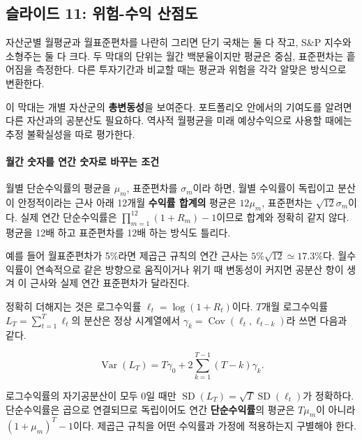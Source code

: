 \documentclass[11pt,a4paper]{article}
\begin{document}
\subsection{슬라이드 11: 위험-수익 산점도}

자산군별 월평균과 월표준편차를 나란히 그리면 단기 국채는 둘 다 작고, S\&P 지수와 소형주는 둘 다 크다. 두 막대의 단위는 월간 백분율이지만 평균은 중심, 표준편차는 흩어짐을 측정한다. 다른 투자기간과 비교할 때는 평균과 위험을 각각 알맞은 방식으로 변환한다.
\par

이 막대는 개별 자산군의 \textbf{총변동성}을 보여준다. 포트폴리오 안에서의 기여도를 알려면 다른 자산과의 공분산도 필요하다. 역사적 월평균을 미래 예상수익으로 사용할 때에는 추정 불확실성을 따로 평가한다.
\par

\paragraph{월간 숫자를 연간 숫자로 바꾸는 조건}

월별 단순수익률의 평균을 $\mu_m$, 표준편차를 $\sigma_m$이라 하면, 월별 수익률이 독립이고 분산이 안정적이라는 근사 아래 12개월 \textbf{수익률 합계의} 평균은 $12\mu_m$, 표준편차는 $\sqrt{12}\sigma_m$이다. 실제 연간 단순수익률은 $\prod_{m=1}^{12}(1+R_m)-1$이므로 합계와 정확히 같지 않다. 평균을 12배 하고 표준편차를 12배 하는 방식도 틀리다.
\par

예를 들어 월표준편차가 5\%라면 제곱근 규칙의 연간 근사는 $5\%\sqrt{12}\simeq17.3\%$다. 월수익률이 연속적으로 같은 방향으로 움직이거나 위기 때 변동성이 커지면 공분산 항이 생겨 이 근사와 실제 연간 표준편차가 달라진다.
\par

정확히 더해지는 것은 로그수익률 $\ell_t=\log(1+R_t)$이다. $T$개월 로그수익률 $L_T=\sum_{t=1}^T\ell_t$의 분산은 정상 시계열에서 $\gamma_k=\operatorname{Cov}(\ell_t,\ell_{t-k})$라 쓰면 다음과 같다.
\par

\[
\operatorname{Var}(L_T)=T\gamma_0+2\sum_{k=1}^{T-1}(T-k)\gamma_k.
\]

로그수익률의 자기공분산이 모두 0일 때만 $\operatorname{SD}(L_T)=\sqrt T\operatorname{SD}(\ell_t)$가 정확하다. 단순수익률은 곱으로 연결되므로 독립이어도 연간 \textbf{단순수익률}의 평균은 $T\mu_m$이 아니라 $(1+\mu_m)^T-1$이다. 제곱근 규칙을 어떤 수익률과 가정에 적용하는지 구별해야 한다.
\par
\end{document}
